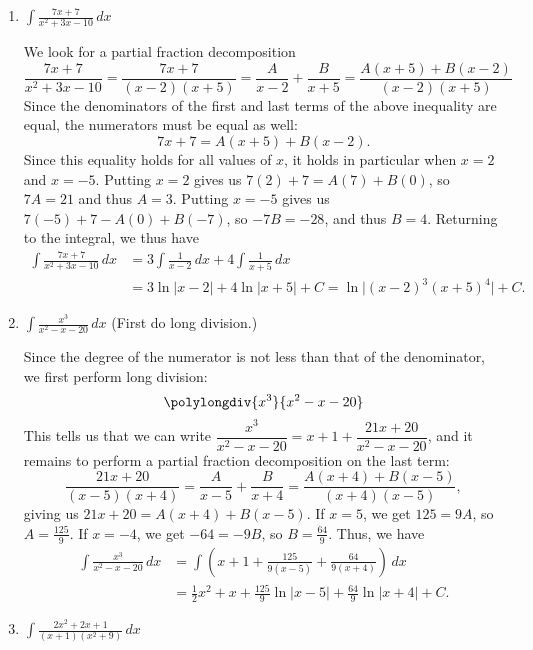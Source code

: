 \documentclass[12pt]{article}
\newcommand{\di}{\displaystyle}
\newcommand{\abs}[1]{\lvert #1\rvert}
\begin{document}
\begin{enumerate}
 \item $\di \int \frac{7x+7}{x^2+3x-10}\,dx$

\medskip

We look for a partial fraction decomposition
\[
 \frac{7x+7}{x^2+3x-10} = \frac{7x+7}{(x-2)(x+5)} = \frac{A}{x-2}+\frac{B}{x+5} = \frac{A(x+5)+B(x-2)}{(x-2)(x+5)}
\]
Since the denominators of the first and last terms of the above inequality are equal, the numerators must be equal as well:
\[
 7x+7 = A(x+5)+B(x-2).
\]
Since this equality holds for all values of $x$, it holds in particular when $x=2$ and $x=-5$. Putting $x=2$ gives us $7(2)+7 = A(7)+B(0)$, so $7A=21$ and thus $A=3$. Putting $x=-5$ gives us $7(-5)+7 - A(0)+B(-7)$, so $-7B = -28$, and thus $B=4$. Returning to the integral, we thus have
\begin{align*}
 \int \frac{7x+7}{x^2+3x-10}\,dx &= 3\int\frac{1}{x-2}\,dx + 4\int\frac{1}{x+5}\,dx\\
& = 3\ln\abs{x-2}+4\ln\abs{x+5}+C = \ln\abs{(x-2)^3(x+5)^4}+C.
\end{align*}




 


 \item $\di \int \frac{x^3}{x^2-x-20}\,dx$ (First do long division.)

\medskip

Since the degree of the numerator is not less than that of the denominator, we first perform long division:
\[
 \polylongdiv{x^3}{x^2-x-20}
\]
This tells us that we can write $\dfrac{x^3}{x^2-x-20} = x+1 + \dfrac{21x+20}{x^2-x-20}$, and it remains to perform a partial fraction decomposition on the last term:
\[
 \frac{21x+20}{(x-5)(x+4)} = \frac{A}{x-5}+\frac{B}{x+4} = \frac{A(x+4)+B(x-5)}{(x+4)(x-5)}, 
\]
giving us $21x+20 = A(x+4)+B(x-5)$. If $x=5$, we get $125 = 9A$, so $A = \frac{125}{9}$. If $x=-4$, we get $-64 = -9B$, so $B = \frac{64}{9}$. Thus, we have
\begin{align*}
 \int \frac{x^3}{x^2-x-20}\,dx & = \int\left(x+1 + \frac{125}{9(x-5)}+\frac{64}{9(x+4)}\right)\,dx\\
& = \frac{1}{2}x^2+x+\frac{125}{9}\ln\abs{x-5}+\frac{64}{9}\ln\abs{x+4}+C.
\end{align*}


 \item $\di \int \frac{2x^2+2x+1}{(x+1)(x^2+9)}\,dx$

\medskip


\end{enumerate}
\end{document}
